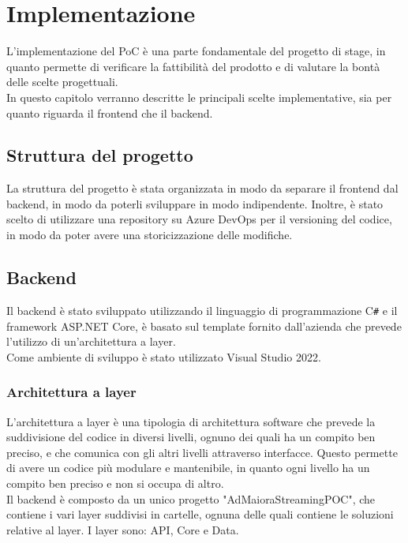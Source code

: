 \chapter{Implementazione}
\label{cap:implementazione}

L'implementazione del PoC è una parte fondamentale del progetto di stage, in quanto permette di verificare la fattibilità del prodotto e di valutare la bontà delle scelte progettuali.\\
In questo capitolo verranno descritte le principali scelte implementative, sia per quanto riguarda il frontend che il backend.\\

\section{Struttura del progetto}
La struttura del progetto è stata organizzata in modo da separare il frontend dal backend, in modo da poterli sviluppare in modo indipendente. Inoltre, è stato scelto di utilizzare una repository su Azure DevOps per il versioning del codice, in modo da poter avere una storicizzazione delle modifiche.
\section{Backend}
Il backend è stato sviluppato utilizzando il linguaggio di programmazione C\texttt{\#} e il framework ASP.NET Core, è basato sul template fornito dall'azienda che prevede l'utilizzo di un'architettura a layer.\\
Come ambiente di sviluppo è stato utilizzato Visual Studio 2022.\\
\subsection{Architettura a layer}
L'architettura a layer è una tipologia di architettura software che prevede la suddivisione del codice in diversi livelli, ognuno dei quali ha un compito ben preciso, e che comunica con gli altri livelli attraverso interfacce. Questo permette di avere un codice più modulare e mantenibile, in quanto ogni livello ha un compito ben preciso e non si occupa di altro.\\
Il backend è composto da un unico progetto "AdMaioraStreamingPOC", che contiene i vari layer suddivisi in cartelle, ognuna delle quali contiene le soluzioni relative al layer. I layer sono: API, Core e Data.\\

